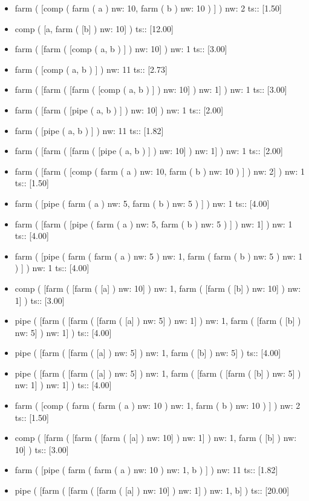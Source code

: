 \documentclass[12pt]{report}
\begin{document}
{\begin{itemize}
\item farm  ( [comp ( farm  ( a )  nw: 10, farm  ( b )  nw: 10 ) ] )  nw: 2 ts::  [1.50] 
\item comp  ( [a, farm  ( [b] )  nw: 10] )  ts::  [12.00] 
\item farm  ( [farm  ( [comp ( a, b ) ] )  nw: 10] )  nw: 1 ts::  [3.00] 
\item farm  ( [comp ( a, b ) ] )  nw: 11 ts::  [2.73] 
\item farm  ( [farm  ( [farm  ( [comp ( a, b ) ] )  nw: 10] )  nw: 1] )  nw: 1 ts::  [3.00] 
\item farm  ( [farm  ( [pipe ( a, b ) ] )  nw: 10] )  nw: 1 ts::  [2.00] 
\item farm  ( [pipe ( a, b ) ] )  nw: 11 ts::  [1.82] 
\item farm  ( [farm  ( [farm  ( [pipe ( a, b ) ] )  nw: 10] )  nw: 1] )  nw: 1 ts::  [2.00] 
\item farm  ( [farm  ( [comp ( farm  ( a )  nw: 10, farm  ( b )  nw: 10 ) ] )  nw: 2] )  nw: 1 ts::  [1.50] 
\item farm  ( [pipe ( farm  ( a )  nw: 5, farm  ( b )  nw: 5 ) ] )  nw: 1 ts::  [4.00] 
\item farm  ( [farm  ( [pipe ( farm  ( a )  nw: 5, farm  ( b )  nw: 5 ) ] )  nw: 1] )  nw: 1 ts::  [4.00] 
\item farm  ( [pipe ( farm  ( farm  ( a )  nw: 5 )  nw: 1, farm  ( farm  ( b )  nw: 5 )  nw: 1 ) ] )  nw: 1 ts::  [4.00] 
\item comp  ( [farm  ( [farm  ( [a] )  nw: 10] )  nw: 1, farm  ( [farm  ( [b] )  nw: 10] )  nw: 1] )  ts::  [3.00] 
\item pipe  ( [farm  ( [farm  ( [farm  ( [a] )  nw: 5] )  nw: 1] )  nw: 1, farm  ( [farm  ( [b] )  nw: 5] )  nw: 1] )  ts::  [4.00] 
\item pipe  ( [farm  ( [farm  ( [a] )  nw: 5] )  nw: 1, farm  ( [b] )  nw: 5] )  ts::  [4.00] 
\item pipe  ( [farm  ( [farm  ( [a] )  nw: 5] )  nw: 1, farm  ( [farm  ( [farm  ( [b] )  nw: 5] )  nw: 1] )  nw: 1] )  ts::  [4.00] 
\item farm  ( [comp ( farm  ( farm  ( a )  nw: 10 )  nw: 1, farm  ( b )  nw: 10 ) ] )  nw: 2 ts::  [1.50] 
\item comp  ( [farm  ( [farm  ( [farm  ( [a] )  nw: 10] )  nw: 1] )  nw: 1, farm  ( [b] )  nw: 10] )  ts::  [3.00] 
\item farm  ( [pipe ( farm  ( farm  ( a )  nw: 10 )  nw: 1, b ) ] )  nw: 11 ts::  [1.82] 
\item pipe  ( [farm  ( [farm  ( [farm  ( [a] )  nw: 10] )  nw: 1] )  nw: 1, b] )  ts::  [20.00] 

\end{itemize}}
\end{document}
